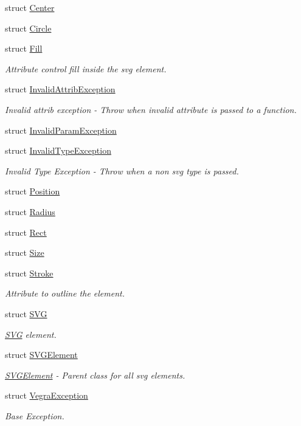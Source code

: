 \begin{DoxyCompactItemize}
\item 
struct \mbox{\hyperlink{structvegra_1_1Center}{Center}}
\item 
struct \mbox{\hyperlink{structvegra_1_1Circle}{Circle}}
\item 
struct \mbox{\hyperlink{structvegra_1_1Fill}{Fill}}
\begin{DoxyCompactList}\small\item\em Attribute control fill inside the svg element. \end{DoxyCompactList}\item 
struct \mbox{\hyperlink{structvegra_1_1InvalidAttribException}{Invalid\+Attrib\+Exception}}
\begin{DoxyCompactList}\small\item\em Invalid attrib exception -\/ Throw when invalid attribute is passed to a function. \end{DoxyCompactList}\item 
struct \mbox{\hyperlink{structvegra_1_1InvalidParamException}{Invalid\+Param\+Exception}}
\item 
struct \mbox{\hyperlink{structvegra_1_1InvalidTypeException}{Invalid\+Type\+Exception}}
\begin{DoxyCompactList}\small\item\em Invalid Type Exception -\/ Throw when a non svg type is passed. \end{DoxyCompactList}\item 
struct \mbox{\hyperlink{structvegra_1_1Position}{Position}}
\item 
struct \mbox{\hyperlink{structvegra_1_1Radius}{Radius}}
\item 
struct \mbox{\hyperlink{structvegra_1_1Rect}{Rect}}
\item 
struct \mbox{\hyperlink{structvegra_1_1Size}{Size}}
\item 
struct \mbox{\hyperlink{structvegra_1_1Stroke}{Stroke}}
\begin{DoxyCompactList}\small\item\em Attribute to outline the element. \end{DoxyCompactList}\item 
struct \mbox{\hyperlink{structvegra_1_1SVG}{S\+VG}}
\begin{DoxyCompactList}\small\item\em \mbox{\hyperlink{structvegra_1_1SVG}{S\+VG}} element. \end{DoxyCompactList}\item 
struct \mbox{\hyperlink{structvegra_1_1SVGElement}{S\+V\+G\+Element}}
\begin{DoxyCompactList}\small\item\em \mbox{\hyperlink{structvegra_1_1SVGElement}{S\+V\+G\+Element}} -\/ Parent class for all svg elements. \end{DoxyCompactList}\item 
struct \mbox{\hyperlink{structvegra_1_1VegraException}{Vegra\+Exception}}
\begin{DoxyCompactList}\small\item\em Base Exception. \end{DoxyCompactList}\end{DoxyCompactItemize}
